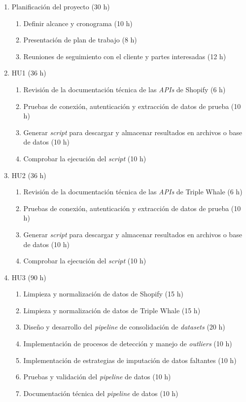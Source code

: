 \documentclass[
11pt, %
]{charter}
\begin{document}
\begin{enumerate}
\item Planificación del proyecto (30 h)
\begin{enumerate}

\item Definir alcance y cronograma (10 h)
\item Presentación de plan de trabajo (8 h)
\item Reuniones de seguimiento con el cliente y partes interesadas (12 h)
\end{enumerate}

\item HU1 (36 h)
\begin{enumerate}
\item Revisión de la documentación técnica de las \textit{APIs} de Shopify (6 h)
\item Pruebas de conexión, autenticación y extracción de datos de prueba (10 h)
\item Generar \textit{script} para descargar y almacenar resultados en archivos o base de datos (10 h)
\item Comprobar la ejecución del \textit{script} (10 h)
\end{enumerate}


\item HU2 (36 h)
\begin{enumerate}
\item Revisión de la documentación técnica de las \textit{APIs} de Triple Whale (6 h)
\item Pruebas de conexión, autenticación y extracción de datos de prueba (10 h)
\item Generar \textit{script} para descargar y almacenar resultados en archivos o base de datos (10 h)
\item Comprobar la ejecución del \textit{script} (10 h)
\end{enumerate}


\item HU3 (90 h)
\begin{enumerate}
\item Limpieza y normalización de datos de Shopify (15 h)
\item Limpieza y normalización de datos de Triple Whale (15 h)
\item Diseño y desarrollo del \textit{pipeline} de consolidación de \textit{datasets} (20 h)
\item Implementación de procesos de detección y manejo de \textit{outliers} (10 h)
\item Implementación de estrategias de imputación de datos faltantes (10 h)
\item Pruebas y validación del \textit{pipeline} de datos (10 h)
\item Documentación técnica del \textit{pipeline} de datos (10 h)
\end{enumerate}



\end{enumerate}
\end{document}
